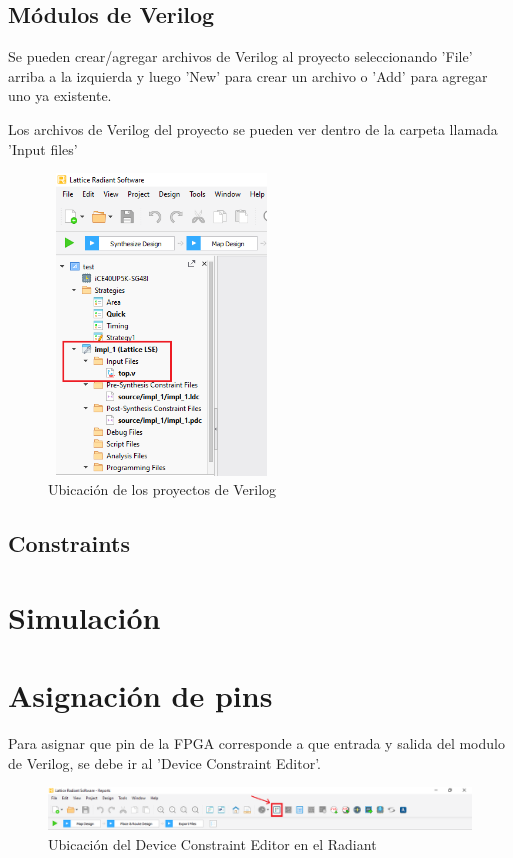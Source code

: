 \documentclass{article}
\begin{document}
\subsection{Módulos de Verilog}
Se pueden crear/agregar archivos de Verilog al proyecto seleccionando 'File' arriba a la izquierda y luego 'New' para crear un archivo o 'Add' para agregar uno ya existente.

Los archivos de Verilog del proyecto se pueden ver dentro de la carpeta llamada 'Input files'
\begin{figure}[H]
	\centering
	\includegraphics[height=8cm,width=6cm]{Imagenes/VerilogArch.png}
	\caption{Ubicación de los proyectos de Verilog}
	\end{figure}

\subsection{Constraints}

\section{Simulación}

\section{Asignación de pins}
Para asignar que pin de la FPGA corresponde a que entrada y salida del modulo de Verilog, se debe ir al 'Device Constraint Editor'.
	\begin{figure}[H]
	\centering
	\includegraphics[width=\textwidth]{Imagenes/pins.png}
	\caption{Ubicación del Device Constraint Editor en el Radiant}
	\end{figure}
	
\end{document}
